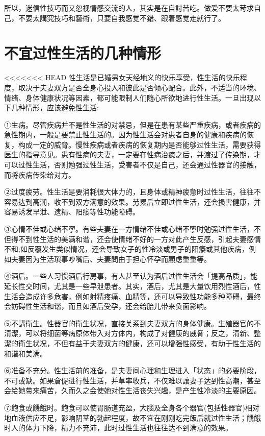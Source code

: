 \documentclass[12pt,UTF8]{ctexbook}
\begin{document}
所以，迷信性技巧而又忽视情感交流的人，其实是在自討苦吃。做爱不要太苛求自己，不要太講究技巧和藝術，只要自我感觉不錯、跟着感觉走就行了。

\section{不宜过性生活的几种情形}

<<<<<<< HEAD
性生活是已婚男女天经地义的快乐享受，性生活的快乐程度，取决于夫妻双方是否全身心投入和彼此是否倾心配合。此外，不适当的环境、情绪、身体健康状况等因素，都可能限制人们隨心所欲地进行性生活。一旦出现以下几种情形，应该避免性生活:

①生病。尽管疾病并不是性生活的对禁忌，但是在患有某些严重疾病，或者疾病的急性期内，一般是要禁止性生活的。因为性生活会对患者自身的健康和疾病的恢复，构成一定的威脅。慢性疾病或者疾病的恢复期内是否能够过性生活，需要获得医生的指导意见。患有性病的夫妻，一定要在性病治癒之后，并渡过了传染期，才可以过性生活，否则勉强过性生活，受害者不仅是自己，还会通过性器官的接触，而将疾病传染给对方。

②过度疲劳。性生活是要消耗很大体力的，且身体或精神疲惫时过性生活，往往不容易达到高潮，收不到双方满意的效果。劳累后立即过性生活，还会损害健康，并容易诱发早泄、遗精、阳痿等性功能障碍。

③心情不佳或心绪不寧。有些夫妻在一方情绪不佳或心绪不寧时勉强过性生活，不但得不到性生活的美满和谐，还会使情绪不好的一方对此产生反感，引起夫妻感情不和;如反覆发生类似情况，还会导致女子的性冷淡或男子的阳痿或其他疾病，例如夫妻因为生活瑣事吵嘴后、夫妻問由于担心怀孕而顧虑重重等。

④酒后。一些人习惯酒后行房事，有人甚至认为酒后过性生活会「提高品质」，能延长性交时间，尤其是一些早泄患者。其实，酒后，尤其是大量饮用烈性酒后，性生活会造成许多危害，例如射精疼痛、血精等，还可以导致性功能多种障碍，最终会妨碍性生活和谐，而且如酒后受孕，还会给胎儿带来负面影响。

⑤不講衛生。性器官的衛生状况，直接关系到夫妻双方的身体健康。生殖器官的不清潔，可以将细菌等病原体带入对方体内，构成了对健康的威脅；反之，清新、整潔的衛生状况，不但有益于夫妻双方的健康，还可以增强性感受，有助于性生活的和谐和美满。

⑥准备不充分。性生活前的准备，是夫妻间心理和生理进入「状态」的必要阶段，不可或缺。如果倉促进行性生活，并草率收兵，不仅难以讓妻子达到性高潮，甚至会给她带来痛苦，久而久之会使她对性生活丧失兴趣，是产生性冷淡的主要原因。

⑦飽食或饑餓时。飽食可以使胃肠道充盈，大腦及全身各个器官(包括性器官)相对地血液供应不足，影响阴茎的勃起程度，故不宜在刚刚吃完飯后就过性生活；饑餓时人的体力下降，精力不充沛，此时过性生活也往往达不到满意的效果。
\end{document}
